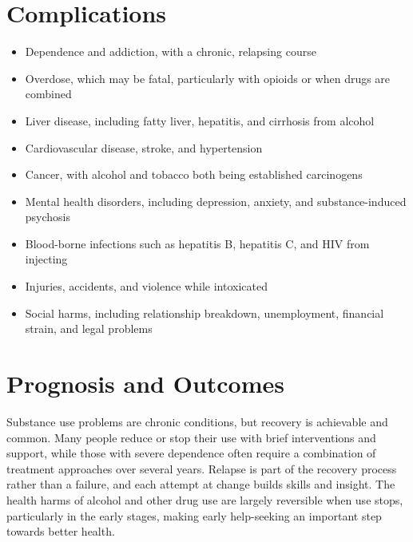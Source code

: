 \section*{Complications}
\begin{itemize}
    \item Dependence and addiction, with a chronic, relapsing course
    \item Overdose, which may be fatal, particularly with opioids or when drugs are combined
    \item Liver disease, including fatty liver, hepatitis, and cirrhosis from alcohol
    \item Cardiovascular disease, stroke, and hypertension
    \item Cancer, with alcohol and tobacco both being established carcinogens
    \item Mental health disorders, including depression, anxiety, and substance-induced psychosis
    \item Blood-borne infections such as hepatitis B, hepatitis C, and HIV from injecting
    \item Injuries, accidents, and violence while intoxicated
    \item Social harms, including relationship breakdown, unemployment, financial strain, and legal problems
\end{itemize}

\section*{Prognosis and Outcomes}
Substance use problems are chronic conditions, but recovery is achievable and common. Many people reduce or stop their use with brief interventions and support, while those with severe dependence often require a combination of treatment approaches over several years. Relapse is part of the recovery process rather than a failure, and each attempt at change builds skills and insight. The health harms of alcohol and other drug use are largely reversible when use stops, particularly in the early stages, making early help-seeking an important step towards better health.

